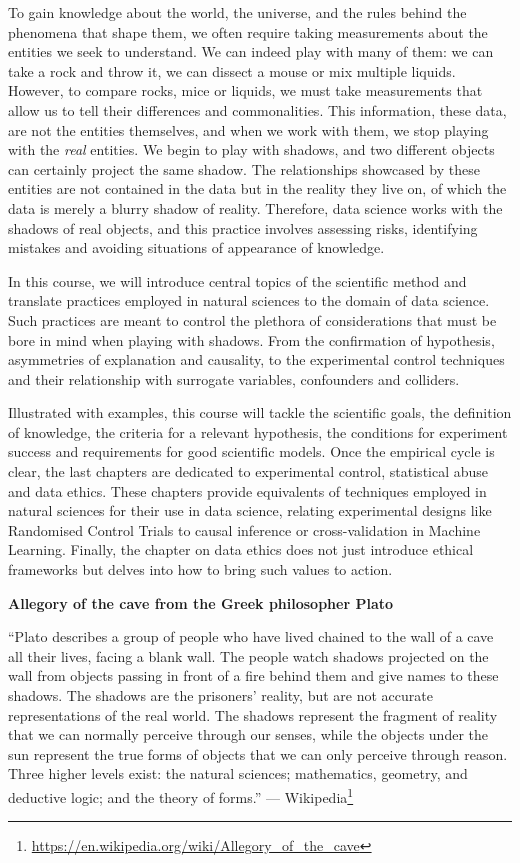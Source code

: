 \documentclass[
  12pt,
]{book}
\DeclareRobustCommand{\href}[2]{#2\footnote{\url{#1}}}
\begin{document}
To gain knowledge about the world, the universe, and the rules behind the phenomena that shape them, we often require taking measurements about the entities we seek to understand. We can indeed play with many of them: we can take a rock and throw it, we can dissect a mouse or mix multiple liquids. However, to compare rocks, mice or liquids, we must take measurements that allow us to tell their differences and commonalities. This information, these data, are not the entities themselves, and when we work with them, we stop playing with the \emph{real} entities. We begin to play with shadows, and two different objects can certainly project the same shadow. The relationships showcased by these entities are not contained in the data but in the reality they live on, of which the data is merely a blurry shadow of reality. Therefore, data science works with the shadows of real objects, and this practice involves assessing risks, identifying mistakes and avoiding situations of appearance of knowledge.

In this course, we will introduce central topics of the scientific method and translate practices employed in natural sciences to the domain of data science. Such practices are meant to control the plethora of considerations that must be bore in mind when playing with shadows. From the confirmation of hypothesis, asymmetries of explanation and causality, to the experimental control techniques and their relationship with surrogate variables, confounders and colliders.

Illustrated with examples, this course will tackle the scientific goals, the definition of knowledge, the criteria for a relevant hypothesis, the conditions for experiment success and requirements for good scientific models. Once the empirical cycle is clear, the last chapters are dedicated to experimental control, statistical abuse and data ethics. These chapters provide equivalents of techniques employed in natural sciences for their use in data science, relating experimental designs like Randomised Control Trials to causal inference or cross-validation in Machine Learning. Finally, the chapter on data ethics does not just introduce ethical frameworks but delves into how to bring such values to action.

\begin{tipbox}

\textbf{Allegory of the cave from the Greek philosopher Plato}

``Plato describes a group of people who have lived chained to the wall of a cave all their lives, facing a blank wall. The people watch shadows projected on the wall from objects passing in front of a fire behind them and give names to these shadows. The shadows are the prisoners' reality, but are not accurate representations of the real world. The shadows represent the fragment of reality that we can normally perceive through our senses, while the objects under the sun represent the true forms of objects that we can only perceive through reason. Three higher levels exist: the natural sciences; mathematics, geometry, and deductive logic; and the theory of forms.'' --- \href{https://en.wikipedia.org/wiki/Allegory_of_the_cave}{Wikipedia}

\end{tipbox}
\end{document}
